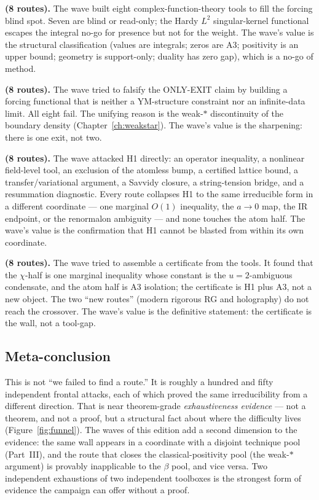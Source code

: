 \textbf{ (8 routes).} The wave built eight complex-function-theory tools to fill the
forcing blind spot. Seven are blind or read-only; the Hardy $L^2$ singular-kernel functional
escapes the integral no-go for presence but not for the weight. The wave's value is the
structural classification (values are integrals; zeros are A3; positivity is an upper bound;
geometry is support-only; duality has zero gap), which is a no-go of method.

\textbf{ (8 routes).} The wave tried to falsify the ONLY-EXIT claim by building a
forcing functional that is neither a YM-structure constraint nor an infinite-data limit. All
eight fail. The unifying reason is the weak-$*$ discontinuity of the boundary density
(Chapter~\ref{ch:weakstar}). The wave's value is the sharpening: there is one exit, not two.

\textbf{ (8 routes).} The wave attacked H1 directly: an operator inequality, a
nonlinear field-level tool, an exclusion of the atomless bump, a certified lattice bound, a
transfer/variational argument, a Savvidy closure, a string-tension bridge, and a resummation
diagnostic. Every route collapses H1 to the same irreducible form in a different coordinate ---
one marginal $O(1)$ inequality, the $a\to0$ map, the IR endpoint, or the renormalon ambiguity ---
and none touches the atom half. The wave's value is the confirmation that H1 cannot be blasted
from within its own coordinate.

\textbf{ (8 routes).} The wave tried to assemble a certificate from the tools. It
found that the $\chi$-half is one marginal inequality whose constant is the $u=2$-ambiguous
condensate, and the atom half is A3 isolation; the certificate is H1 plus A3, not a new object.
The two ``new routes'' (modern rigorous RG and holography) do not reach the crossover. The wave's
value is the definitive statement: the certificate is the wall, not a tool-gap.

\subsection{Meta-conclusion}

This is not ``we failed to find a route.'' It is roughly a hundred and fifty independent frontal
attacks, each of which proved the same irreducibility from a different direction. That is near
theorem-grade \emph{exhaustiveness evidence} --- not a theorem, and not a proof, but a structural
fact about where the difficulty lives (Figure~\ref{fig:funnel}). The waves of this edition add a
second dimension to the evidence: the same wall appears in a coordinate with a disjoint
technique pool (Part~III), and the route that closes the classical-positivity pool (the weak-$*$
argument) is provably inapplicable to the $\beta$ pool, and vice versa. Two independent
exhaustions of two independent toolboxes is the strongest form of evidence the campaign can
offer without a proof.

